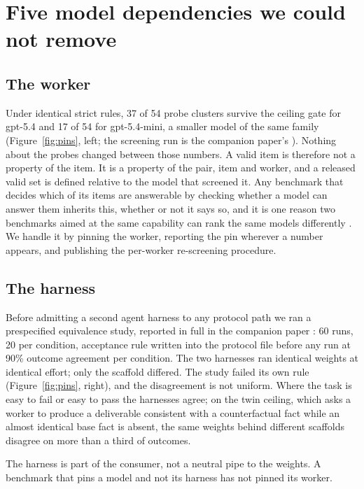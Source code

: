 \documentclass[11pt]{article}
\begin{document}
\section{Five model dependencies we could not remove}

\subsection{The worker}

Under identical strict rules, 37 of 54 probe clusters survive the ceiling gate
for gpt-5.4 and 17 of 54 for gpt-5.4-mini, a smaller model of the same family
(Figure~\ref{fig:pins}, left; the screening run is the companion paper's
\cite{companion}). Nothing about the probes changed between those
numbers. A valid item is therefore not a property of the item. It is a
property of the pair, item and worker, and a released valid set is defined
relative to the model that screened it. Any benchmark that decides which of
its items are answerable by checking whether a model can answer them inherits
this, whether or not it says so, and it is one reason two benchmarks aimed at
the same capability can rank the same models differently \cite{benchbench}. We
handle it by pinning the worker, reporting
the pin wherever a number appears, and publishing the per-worker re-screening
procedure.

\subsection{The harness}

Before admitting a second agent harness to any protocol path we ran a
prespecified equivalence study, reported in full in the companion paper
\cite{companion}: 60 runs, 20 per condition, acceptance rule
written into the protocol file before any run at 90\% outcome agreement per
condition. The two harnesses ran identical weights at identical effort; only
the scaffold differed. The study failed its own rule (Figure~\ref{fig:pins},
right), and the disagreement is not uniform. Where the task is easy to fail or
easy to pass the harnesses agree; on the twin ceiling, which asks a worker to
produce a deliverable consistent with a counterfactual fact while an almost
identical base fact is absent, the same weights behind different scaffolds
disagree on more than a third of outcomes.

The harness is part of the consumer, not a neutral pipe to the weights. A
benchmark that pins a model and not its harness has not pinned its worker.
\end{document}
